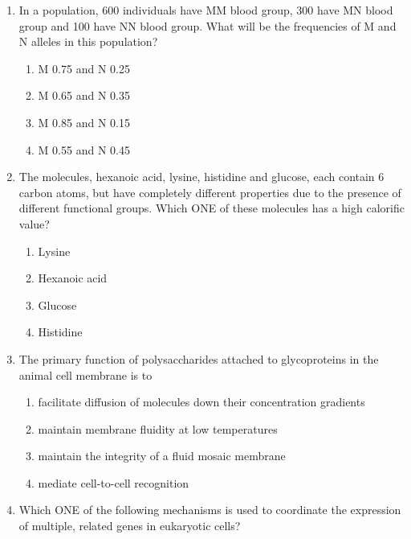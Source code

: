 \documentclass[journal,12pt,onecolumn]{IEEEtran}
\begin{document}
\begin{enumerate}[label=\arabic*.,resume]

\item In a population, 600 individuals have MM blood group, 300 have MN blood group and 100 have NN blood group. What will be the frequencies of M and N alleles in this population?

\begin{multicols}{2}
\begin{enumerate}[label=(\Alph*)]
\item M 0.75 and N 0.25
\item M 0.65 and N 0.35
\item M 0.85 and N 0.15
\item M 0.55 and N 0.45
\end{enumerate}
\end{multicols}

\item The molecules, hexanoic acid, lysine, histidine and glucose, each contain 6 carbon atoms, but have completely different properties due to the presence of different functional groups.  Which ONE of these molecules has a high calorific value?

\begin{multicols}{4}
\begin{enumerate}[label=(\Alph*)]
\item Lysine
\item Hexanoic acid
\item Glucose
\item Histidine
\end{enumerate}
\end{multicols}

\item The primary function of polysaccharides attached to glycoproteins in the animal cell membrane is to

\begin{enumerate}[label=(\Alph*)]
\item facilitate diffusion of molecules down their concentration gradients
\item maintain membrane fluidity at low temperatures
\item maintain the integrity of a fluid mosaic membrane
\item mediate cell-to-cell recognition
\end{enumerate}
\item Which ONE of the following mechanisms is used to coordinate the expression of multiple, related genes in eukaryotic cells?


\end{enumerate}
\end{document}
